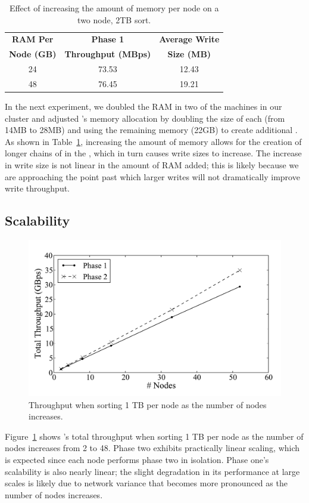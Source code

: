 \begin{table}
\centering
\caption{\label{table:bigmem}Effect of increasing the amount of memory per
  node on a two node, 2TB sort.}
\begin{tabular}{|c|c|c|}
\hline
\textbf{RAM Per}  & \textbf{Phase 1}  & \textbf{Average Write} \\
\textbf{Node (GB)} & \textbf{Throughput (MBps)} & \textbf{Size (MB)} \\
\hline
24 & 73.53 & 12.43 \\
48 & 76.45 & 19.21 \\
\hline
\end{tabular}
\end{table}

In the next experiment, we doubled the RAM in two of the machines in our
cluster and adjusted \tritonsort's memory allocation by doubling the size of
each \writerbuffer (from 14MB to 28MB) and using the remaining memory (22GB)
to create additional \ldbuffers. As shown in Table~\ref{table:bigmem},
increasing the amount of memory allows for the creation of longer chains of
\ldbuffers in the \ldts, which in turn causes write sizes to increase. The
increase in write size is not linear in the amount of RAM added; this is likely
because we are approaching the point past which larger writes will not
dramatically improve write throughput.

\subsection{\tritonsort Scalability}

\begin{figure}[T]
    \centering
    \includegraphics[width=\columnwidth]{tritonsort/graphs/scalability.pdf}

    \caption{\label{fig:scalability}Throughput when sorting 1 TB per node as the number of nodes increases.}
\end{figure}

Figure~\ref{fig:scalability} shows \tritonsort's total throughput when sorting
1 TB per node as the number of nodes increases from 2 to 48. Phase two exhibits
practically linear scaling, which is expected since each node performs phase
two in isolation.  Phase one's scalability is also nearly linear; the slight
degradation in its performance at large scales is likely due to network
variance that becomes more pronounced as the number of nodes increases.

